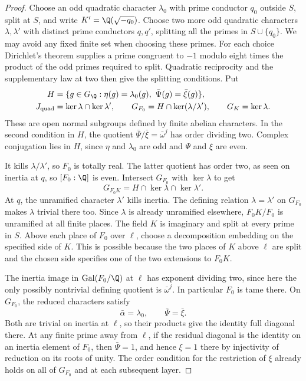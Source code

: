 \begin{proof}
Choose an odd quadratic character \(\lambda_0\) with prime
conductor \(q_0\) outside \(S\), split at \(S\), and
write \(K'=\Q(\sqrt{-q_0})\).
Choose two more odd quadratic characters \(\lambda,\lambda'\)
with distinct prime conductors \(q,q'\), splitting all
the primes in \(S\cup\{q_0\}\).
We may avoid any fixed finite set when choosing these primes.
For each choice Dirichlet's theorem supplies a prime
congruent to \(-1\) modulo eight times the product of the
odd primes required to split. Quadratic reciprocity and
the supplementary law at two then give the splitting
conditions. Put
\[
 \begin{split}
 H&=\{g\in G_{\Q}:\eta(g)=\lambda_0(g),\
                        \bar\Psi(g)=\bar\xi(g)\},\\
 J_{\mathrm{quad}}&=\ker\lambda\cap\ker\lambda',\qquad
 G_{F_0}=H\cap\ker(\lambda/\lambda'),\qquad G_K=\ker\lambda .
 \end{split}
\]
These are open normal subgroups defined by finite abelian
characters. In the second condition in \(H\), the quotient
\(\bar\Psi/\bar\xi=\bar\omega^j\) has order dividing two.
Complex conjugation lies in \(H\), since \(\eta\) and
\(\lambda_0\) are odd and \(\Psi\) and \(\xi\) are even.

It kills \(\lambda/\lambda'\), so \(F_0\) is totally real.
The latter quotient has order two, as seen on inertia at
\(q\), so \([F_0:\Q]\) is even.
Intersect \(G_{F_0}\) with \(\ker\lambda\) to get
\[
              G_{F_0K}=H\cap\ker\lambda\cap\ker\lambda'.
\]
At \(q\), the unramified character \(\lambda'\) kills inertia.
The defining relation \(\lambda=\lambda'\) on \(G_{F_0}\)
makes \(\lambda\) trivial there too. Since \(\lambda\) is already
unramified elsewhere, \(F_0K/F_0\) is unramified at all finite places.
The field \(K\) is imaginary and split at every prime
in \(S\). Above each place of \(F_0\) over \(\ell\),
choose a decomposition embedding on the specified side of
\(K\). This is possible because the two places of \(K\)
above \(\ell\) are split and the chosen side specifies one
of the two extensions to \(F_0K\).

The inertia image in \(\operatorname{Gal}(F_0/\Q)\) at
\(\ell\) has exponent dividing two, since here the only
possibly nontrivial defining quotient is \(\bar\omega^j\).
In particular \(F_0\) is tame there.
On \(G_{F_0}\), the reduced characters satisfy
\[
        \bar\alpha=\lambda_0,\qquad\bar\Psi=\bar\xi.
\]
Both are trivial on inertia at \(\ell\), so their products
give the identity full diagonal there.
At any finite prime away from \(\ell\), if the
residual diagonal is the identity on an inertia element
of \(F_0\), then \(\bar\Psi=1\), and hence \(\xi=1\)
there by injectivity of reduction on its roots of unity.
The order condition for the restriction of \(\xi\) already
holds on all of \(G_{F_0}\) and at each subsequent layer.

\end{proof}

